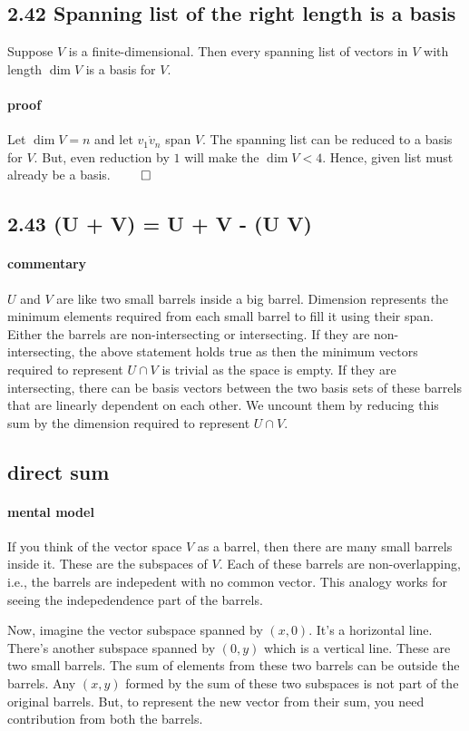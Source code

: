 \documentclass{report}
\begin{document}
\subsection*{2.42 Spanning list of the right length is a basis}
Suppose $V$ is a finite-dimensional. Then every spanning list of vectors in $V$ with length $\dim V$ is a basis for $V$. 
\paragraph{proof} Let $\dim V = n$ and let $v_1 \dot v_n$ span $V$. The spanning list can be reduced to a basis for $V$. But, even reduction by $1$ will make the $\dim V < 4$. Hence, given list must already be a basis. $\qed$

\subsection*{2.43 \dim(U + V) = \dim U + \dim V - \dim (U \cap V)}
\paragraph{commentary} $U$ and $V$ are like two small barrels inside a big barrel. Dimension represents the minimum elements required from each small barrel to fill it using their span. Either the barrels are non-intersecting or intersecting. If they are non-intersecting, the above statement holds true as then the minimum vectors required to represent $U \cap V$ is trivial as the space is empty. If they are intersecting, there can be basis vectors between the two basis sets of these barrels that are linearly dependent on each other. We uncount them by reducing this sum by the dimension required to represent $U \cap V$.

\subsection*{direct sum}
\paragraph{mental model} If you think of the vector space $V$ as a barrel, then there are many small barrels inside it. These are the subspaces of $V$. Each of these barrels are non-overlapping, i.e., the barrels are indepedent with no common vector. This analogy works for seeing the indepedendence part of the barrels. 

Now, imagine the vector subspace spanned by $(x,0)$. It's a horizontal line. There's another subspace spanned by $(0,y)$ which is a vertical line. These are two small barrels. The sum of elements from these two barrels can be outside the barrels. Any $(x,y)$ formed by the sum of these two subspaces is not part of the original barrels. But, to represent the new vector from their sum, you need contribution from both the barrels.
\end{document}
